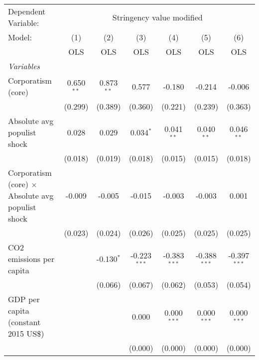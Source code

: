 
\begingroup
\centering
\begin{tabular}{lcccccc}
   \toprule
   Dependent Variable: & \multicolumn{6}{c}{Stringency value modified}\\
   Model:                                                   & (1)          & (2)          & (3)            & (4)            & (5)            & (6)\\  
                                                            &  OLS         & OLS          & OLS            & OLS            & OLS            & OLS\\  
   \midrule
   \emph{Variables}\\
   Corporatism (core)                                       & 0.650$^{**}$ & 0.873$^{**}$ & 0.577          & -0.180         & -0.214         & -0.006\\   
                                                            & (0.299)      & (0.389)      & (0.360)        & (0.221)        & (0.239)        & (0.363)\\   
   Absolute avg populist shock                              & 0.028        & 0.029        & 0.034$^{*}$    & 0.041$^{**}$   & 0.040$^{**}$   & 0.046$^{**}$\\   
                                                            & (0.018)      & (0.019)      & (0.018)        & (0.015)        & (0.015)        & (0.018)\\   
   Corporatism (core) $\times$ Absolute avg populist shock  & -0.009       & -0.005       & -0.015         & -0.003         & -0.003         & 0.001\\   
                                                            & (0.023)      & (0.024)      & (0.026)        & (0.025)        & (0.025)        & (0.025)\\   
   CO2 emissions per capita                                 &              & -0.130$^{*}$ & -0.223$^{***}$ & -0.383$^{***}$ & -0.388$^{***}$ & -0.397$^{***}$\\   
                                                            &              & (0.066)      & (0.067)        & (0.062)        & (0.053)        & (0.054)\\   
   GDP per capita (constant 2015 US\$)                      &              &              & 0.000          & 0.000$^{***}$  & 0.000$^{***}$  & 0.000$^{***}$\\   
                                                            &              &              & (0.000)        & (0.000)        & (0.000)        & (0.000)\\   

\end{tabular}
